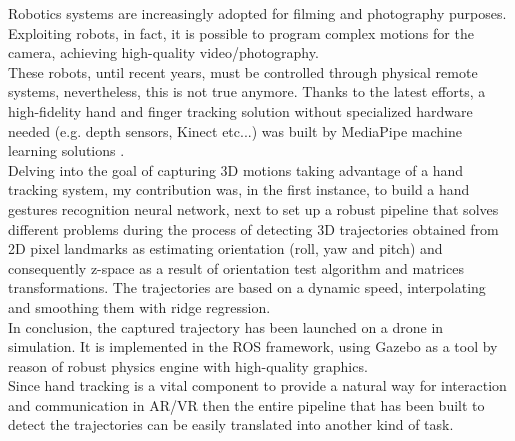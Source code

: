 Robotics systems are increasingly adopted for filming and photography purposes. Exploiting robots, in fact, it is possible to program complex motions for the camera, achieving high-quality video/photography. \\ 

\noindent These robots, until recent years, must be controlled through physical remote systems, nevertheless, this is not true anymore. Thanks to the latest efforts, a high-fidelity hand and finger tracking solution without specialized hardware needed (e.g. depth sensors, Kinect etc...) was built by MediaPipe machine learning solutions \cite[]{zhang2020mediapipe}.\\

\noindent Delving into the goal of capturing 3D motions taking advantage of a hand tracking system, my contribution was, in the first instance, to build a hand gestures recognition neural network, next to set up a robust pipeline that solves different problems during the process of detecting 3D trajectories obtained from 2D pixel landmarks as estimating orientation (roll, yaw and pitch) and consequently z-space as a result of orientation test algorithm and matrices transformations. The trajectories are based on a dynamic speed, interpolating and smoothing them with ridge regression. \\

\noindent In conclusion, the captured trajectory has been launched on a drone in simulation. It is implemented in the ROS framework, using Gazebo as a tool by reason of robust physics engine with high-quality graphics. \\

\noindent Since hand tracking is a vital component to provide a natural way for interaction and communication in AR/VR then the entire pipeline that has been built to detect the trajectories can be easily translated into another kind of task.